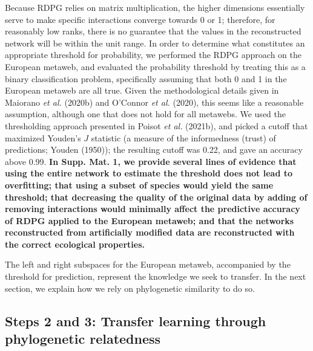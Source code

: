 \documentclass[11pt]{article}
\makeatletter
\def\maxwidth{\ifdim\Gin@nat@width>\linewidth\linewidth
\else\Gin@nat@width\fi}
\let\Oldincludegraphics\includegraphics
\renewcommand{\includegraphics}[1]{\Oldincludegraphics[width=\maxwidth]{#1}}
\providecommand{\DIFaddtex}[1]{{\bf #1}} %
\providecommand{\DIFaddbegin}{\protect\color{blue}} %
\providecommand{\DIFaddend}{\protect\color{black}} %
\providecommand{\DIFadd}[1]{\texorpdfstring{\DIFaddtex{#1}}{#1}} %
\newcommand{\DIFaddincludegraphics}[2][]{{\color{blue}\fbox{\DIFOincludegraphics[#1]{#2}}}} %
\DeclareRobustCommand{\DIFaddbegin}{\DIFOaddbegin \let\includegraphics\DIFaddincludegraphics} %
\DeclareRobustCommand{\DIFaddend}{\DIFOaddend \let\includegraphics\DIFOincludegraphics} %
\makeatother
\begin{document}
Because RDPG relies on matrix multiplication, the higher dimensions
essentially serve to make specific interactions converge towards 0 or 1;
therefore, for reasonably low ranks, there is no guarantee that the
values in the reconstructed network will be within the unit range. In
order to determine what constitutes an appropriate threshold for
probability, we performed the RDPG approach on the European metaweb, and
evaluated the probability threshold by treating this as a binary
classification problem, specifically assuming that both 0 and 1 in the
European metaweb are all true. Given the methodological details given in
Maiorano \emph{et al.} (2020b) and O'Connor \emph{et al.} (2020), this
seems like a reasonable assumption, although one that does not hold for
all metawebs. We used the thresholding approach presented in Poisot
\emph{et al.} (2021b), and picked a cutoff that maximized Youden's \(J\)
statistic (a measure of the informedness (trust) of predictions; Youden
(1950)); the resulting cutoff was 0.22, and gave an accuracy above 0.99.
\DIFaddbegin \DIFadd{In Supp. Mat. 1, we provide several lines of evidence that using the
entire network to estimate the threshold does not lead to overfitting;
that using a subset of species would yield the same threshold; that
decreasing the quality of the original data by adding of removing
interactions would minimally affect the predictive accuracy of RDPG
applied to the European metaweb; and that the networks reconstructed
from artificially modified data are reconstructed with the correct
ecological properties.
}\DIFaddend 

The left and right subspaces for the European metaweb, accompanied by
the threshold for prediction, represent the knowledge we seek to
transfer. In the next section, we explain how we rely on phylogenetic
similarity to do so.

\hypertarget{steps-2-and-3-transfer-learning-through-phylogenetic-relatedness}{%
\subsection{Steps 2 and 3: Transfer learning through phylogenetic
relatedness}\label{steps-2-and-3-transfer-learning-through-phylogenetic-relatedness}}
\end{document}
